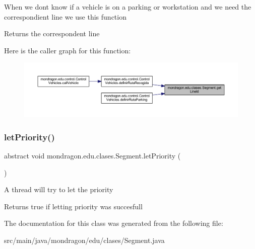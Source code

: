When we dont know if a vehicle is on a parking or workstation and we need the correspondient line we use this function

\begin{DoxyReturn}{Returns}
the correspondent line 
\end{DoxyReturn}
Here is the caller graph for this function\+:\nopagebreak
\begin{figure}[H]
\begin{center}
\leavevmode
\includegraphics[width=350pt]{classmondragon_1_1edu_1_1clases_1_1_segment_af905b954e40e0c3d5b58673b03b972cc_icgraph}
\end{center}
\end{figure}
\mbox{\label{classmondragon_1_1edu_1_1clases_1_1_segment_af903bad2ccfd51fe2f8d21d437143a1e}} 
\subsubsection{\texorpdfstring{letPriority()}{letPriority()}}
{\footnotesize\ttfamily abstract void mondragon.\+edu.\+clases.\+Segment.\+let\+Priority (\begin{DoxyParamCaption}{ }\end{DoxyParamCaption})\hspace{0.3cm}{\ttfamily [abstract]}}

A thread will try to let the priority

\begin{DoxyReturn}{Returns}
true if letting priority was succesfull 
\end{DoxyReturn}


The documentation for this class was generated from the following file\+:\begin{DoxyCompactItemize}
\item 
src/main/java/mondragon/edu/clases/Segment.\+java\end{DoxyCompactItemize}
